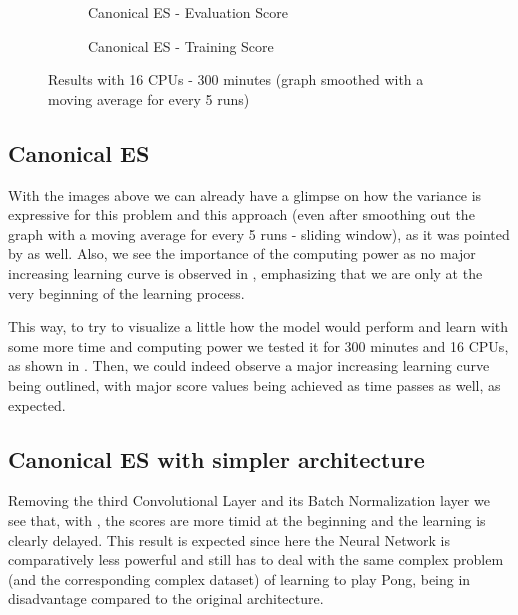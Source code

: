 \documentclass[10pt]{article} %
\begin{document}
\begin{figure}[ht]
\captionsetup{justification=centering}
\begin{subfigure}[t]{.49\textwidth}
		\centering
		
		\caption{Canonical ES - Evaluation Score}
		\label{fig:canonical-long-run-eval}
\end{subfigure}
\begin{subfigure}[t]{.49\textwidth}
		\centering
		
		\caption{Canonical ES - Training Score}
		\label{fig:canonical-long-run-train}
\end{subfigure}

\caption{Results with 16 CPUs - 300 minutes (graph smoothed with a moving average for every 5 runs)}
\label{fig:results-300}
\end{figure}

\subsection{Canonical ES}
With the images above we can already have a glimpse on how the variance is expressive for this problem and this approach (even after smoothing out the graph with a moving average for every 5 runs - sliding window), as it was pointed by \cite{back-to-basics} as well. Also, we see the importance of the computing power as no major increasing learning curve is observed in , emphasizing that we are only at the very beginning of the learning process.

This way, to try to visualize a little how the model would perform and learn with some more time and computing power we tested it for 300 minutes and 16 CPUs, as shown in . Then, we could indeed observe a major increasing learning curve being outlined, with major score values being achieved as time passes as well, as expected.

\subsection{Canonical ES with simpler architecture}
Removing the third Convolutional Layer and its Batch Normalization layer we see that, with , the scores are more timid at the beginning and the learning is clearly delayed. This result is expected since here the Neural Network is comparatively less powerful and still has to deal with the same complex problem (and the corresponding complex dataset) of learning to play Pong, being in disadvantage compared to the original architecture. 
\end{document}
